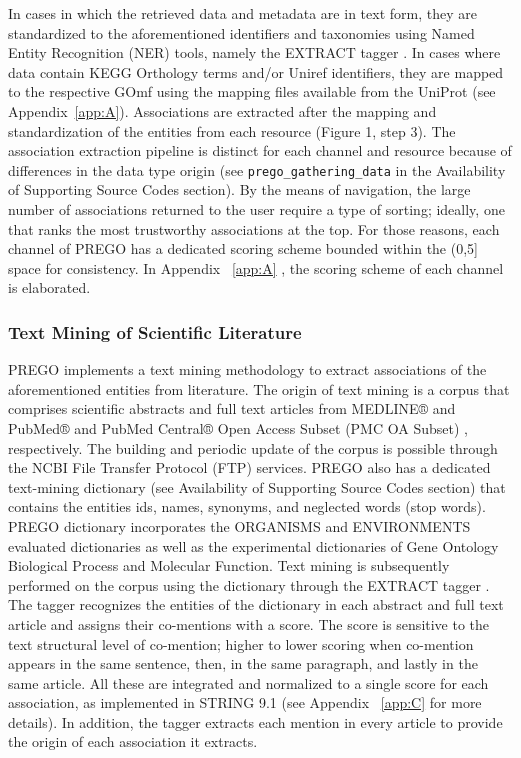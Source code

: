    In cases in which the retrieved data and metadata are in text form, they are standardized to the aforementioned identifiers and taxonomies using Named Entity Recognition (NER) tools, namely the EXTRACT tagger \citep{pafilis2016extract, jensen2016one}. 
   In cases where data contain KEGG Orthology terms and/or Uniref identifiers, they are mapped to the respective GOmf using the mapping files available from the UniProt (see Appendix~\ref{app:A}). 
   Associations are extracted after the mapping and standardization of the entities from each resource (Figure 1, step 3).
   The association extraction pipeline is distinct for each channel and resource because of differences in the data type origin (see \texttt{prego\_gathering\_data} in the Availability of Supporting Source Codes section). 
   By the means of navigation, the large number of associations returned to the user require a type of sorting; ideally, one that ranks the most trustworthy associations at the top. 
   For those reasons, each channel of PREGO has a dedicated scoring scheme bounded within the (0,5] space for consistency. 
   In Appendix ~\ref{app:A} , the scoring scheme of each channel is elaborated.




   \subsubsection*{Text Mining of Scientific Literature}
   \label{subsec:prego-tm}

   PREGO implements a text mining methodology to extract associations of the aforementioned entities from literature. 
   The origin of text mining is a corpus that comprises scientific abstracts and full text articles from MEDLINE® and PubMed® and PubMed Central® Open Access Subset (PMC OA Subset) \citep{sayers2021database}, respectively. 
   The building and periodic update of the corpus is possible through the NCBI File Transfer Protocol (FTP) services. 
   PREGO also has a dedicated text-mining dictionary (see Availability of Supporting Source Codes section) that contains the entities ids, names, synonyms, and neglected words (stop words). 
   PREGO dictionary incorporates the ORGANISMS \citep{pafilis2013species} and ENVIRONMENTS \citep{pafilis2015environments} evaluated dictionaries as well as the experimental dictionaries of Gene Ontology Biological Process and Molecular Function.
   Text mining is subsequently performed on the corpus using the dictionary through the EXTRACT tagger \citep{pafilis2016extract, jensen2016one}. 
   The tagger recognizes the entities of the dictionary in each abstract and full text article and assigns their co-mentions with a score. 
   The score is sensitive to the text structural level of co-mention; higher to lower scoring when co-mention appears in the same sentence, then, in the same paragraph, and lastly in the same article. 
   All these are integrated and normalized to a single score for each association, as implemented in STRING 9.1 \citep{franceschini2012string} (see Appendix ~\ref{app:C} for more details). 
   In addition, the tagger extracts each mention in every article to provide the origin of each association it extracts.


